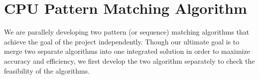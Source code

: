 \section{CPU Pattern Matching Algorithm}
\label{sec:algorithm}

We are parallely developing two  pattern (or sequence) matching algorithms that achieve the goal of the project independently. Though our ultimate goal is to merge two separate algorithms into one integrated solution in order to maximize accuracy and efficiency, we first develop the two algorithm separately to check the feasibility of the algorithms.




